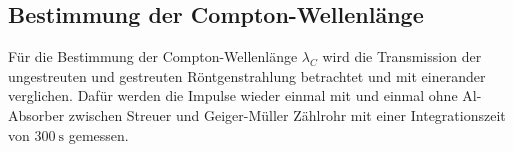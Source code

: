 \subsection{Bestimmung der Compton-Wellenlänge }
Für die Bestimmung der Compton-Wellenlänge $\lambda_C$ wird die Transmission der ungestreuten und gestreuten Röntgenstrahlung betrachtet und mit einerander verglichen. Dafür werden die Impulse 
wieder einmal mit und einmal ohne Al-Absorber zwischen Streuer und Geiger-Müller Zählrohr mit einer Integrationszeit von $\SI{300}{\second}$ gemessen.








